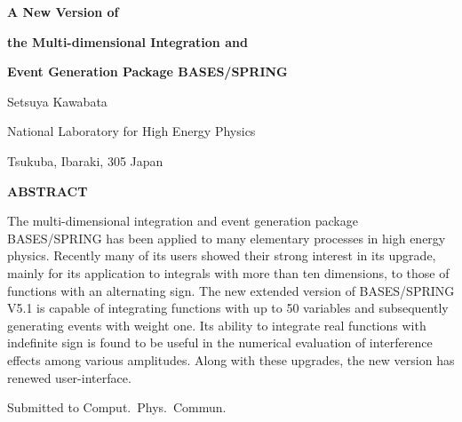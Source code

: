 %
\vskip 4.0cm
%
\begin{center}
\begin{minipage}{14cm}
\centerline{\bf A New Version of }
\centerline{\bf the Multi-dimensional Integration and }
\centerline{\bf Event Generation Package  BASES/SPRING }
\vskip 2.0cm
%
\centerline{Setsuya Kawabata}
\medskip
\centerline{\small National Laboratory for High Energy Physics }
\centerline{\small Tsukuba, Ibaraki, 305 Japan }
%
\end{minipage}\end{center}
%
%
\vskip 4.0cm
\centerline{\bf ABSTRACT}
\par\vskip 1.0cm
\begin{center}
\begin{minipage}{12cm}
\noindent
 The multi-dimensional integration and event generation package
 {\small BASES/SPRING} has been applied to many elementary processes in high energy 
 physics. Recently many of its users showed their strong interest in its
 upgrade, 
  mainly for its application to integrals with more than ten dimensions, to 
 those of functions with an alternating sign. The new
extended version of {\small BASES/SPRING V5.1} is capable of integrating functions with
up to 50 variables and subsequently generating events with
 weight one. Its ability to integrate real functions with indefinite sign is
 found to be useful in the numerical evaluation of interference effects among
 various amplitudes.
Along with these upgrades, the new version has renewed user-interface.
 \end{minipage}
 \par
 \end{center}
\vskip 4.0cm
\centerline{Submitted to Comput.~Phys.~Commun.}